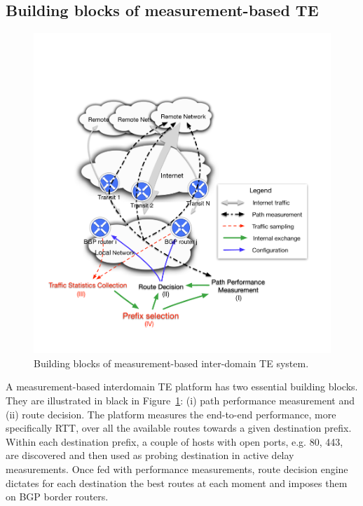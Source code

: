 \subsection{Building blocks of measurement-based TE}

\begin{figure}[!htb]
\centering
\includegraphics[width=\textwidth]{gfx/chap1/archi.pdf}
\caption{Building blocks of measurement-based inter-domain TE system.}
\label{fig:archi}
\end{figure}

A measurement-based interdomain TE platform has two essential building blocks.
They are illustrated in black in Figure~\ref{fig:archi}: (i) path performance measurement and (ii) route decision.
The platform measures the end-to-end performance, more specifically \acf{RTT}, over all the available routes towards a given destination prefix. 
Within each destination prefix, a couple of hosts with open ports, e.g. 80, 443, are discovered and then used as probing destination in active delay measurements.
Once fed with performance measurements, route decision engine dictates for each destination the best routes at each moment and imposes them on BGP border routers.

